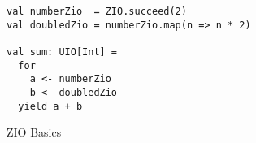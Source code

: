 \begin{algorithm}

\begin{verbatim}
val numberZio  = ZIO.succeed(2)
val doubledZio = numberZio.map(n => n * 2)

val sum: UIO[Int] =
  for
    a <- numberZio
    b <- doubledZio
  yield a + b
\end{verbatim}

\caption{ZIO Basics \label{zio:basics}}
\end{algorithm}